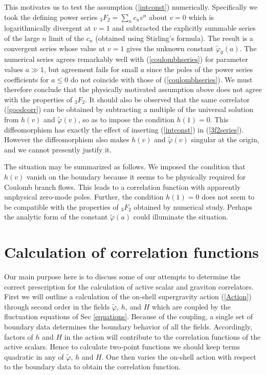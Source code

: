 \documentclass[a4paper,12pt]{article}
\def\varphit{\tilde{\varphi}}
\begin{document}
This motivates us to test the assumption (\ref{intconst}) numerically.
Specifically we took the defining power series $_3F_2= \sum_n c_n v^n$
about $v=0$ which is logarithmically divergent at $v=1$ and subtracted
the explicitly summable series of the large $n$ limit of the $c_n$
(obtained using Stirling's formula). The result is a convergent series
whose value at $v=1$ gives the unknown constant ${\varphit_0(a)}$. The
numerical series agrees remarkably well with (\ref{coulombhseries})
for parameter values $a \gg 1$, but agreement fails for small $a$ since
the poles of the power series coefficients for $a \leq 0$ do not
coincide with those of (\ref{coulombhseries}).  We must therefore
conclude that the physically motivated assumption above does not agree
with the properties of $_3F_2$. It should also be observed that
the same correlator (\ref{goodcorr}) can be obtained by subtracting a
multiple of the universal solution from $h(v)$ and $\varphit(v)$, so as
to impose the condition $h(1)=0$.
This diffeomorphism has exactly the effect of inserting
(\ref{intconst}) in (\ref{3f2series}). However the diffeomorphism also
makes $h(v)$ and $\varphit(v)$ singular at the origin, and we cannot
presently justify it.

The situation may be summarized as follows. We imposed the condition
that $h(v)$ vanish on the boundary because it seems to be physically
required for Coulomb branch flows. This leads to a correlation function
with apparently unphysical zero-mode poles. Further, the condition
$h(1)=0$ does not seem to be compatible with the properties of $_3F_2$
obtained by numerical study. Perhaps the analytic form of the constant
$\varphit(a)$ could illuminate the situation.  




\section{Calculation of correlation functions}
\label{2point}

Our main purpose here is to discuss some of our attempts to determine
the correct prescription for the calculation of active scalar and
graviton correlators. First we will outline a calculation of the
on-shell supergravity action (\ref{Action}) through second order in
the fields $\varphit$, $h$, and $H$ which are coupled by the
fluctuation equations of Sec \ref{equations}. Because of the coupling,
a single set of boundary data determines the boundary behavior of all
the fields.  Accordingly, factors of $h$ and $H$ in the action will
contribute to the correlation functions of the active scalars. Hence
to calculate two-point functions we should keep terms quadratic in any
of $\varphit$, $h$ and $H$.  One then varies the on-shell action with
respect to the boundary data to obtain the correlation function.
\end{document}
